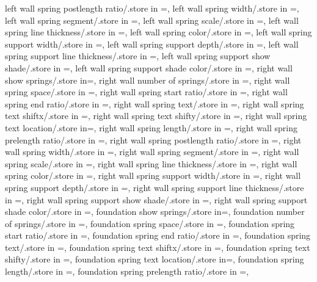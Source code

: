 {left wall spring postlength ratio/.store in =\leftwpostlenratio,
left wall spring width/.store in =\leftwampl,
left wall spring segment/.store in =\leftwsegm,
left wall spring scale/.store in =\leftwspringscale,
left wall spring line thickness/.store in =\leftwspringthk,
left wall spring color/.store in =\leftwspringcolor,
left wall spring support width/.store in =\leftwsuppwidth,
left wall spring support depth/.store in =\leftwsuppdepth,
left wall spring support line thickness/.store in =\leftwsupplinethk,
left wall spring support show shade/.store in =\leftwshowsuppshade,
left wall spring support shade color/.store in =\leftwsuppshadecol,
right wall show springs/.store in=\rightwshowsprings,
right wall number of springs/.store in =\rightwspringnumber,
right wall spring space/.store in =\rightwspringspace,
right wall spring start ratio/.store in =\rightwspringstartratio,
right wall spring end ratio/.store in =\rightwspringendratio,
right wall spring text/.store in =\rightwspringtext,
right wall spring text shiftx/.store in =\rightwtextshiftx,
right wall spring text shifty/.store in =\rightwtextshifty,
right wall spring text location/.store in=\rightwspringtextloc,
right wall spring length/.store in =\rightwspringlength,
right wall spring prelength ratio/.store in =\rightwprelenratio,
right wall spring postlength ratio/.store in =\rightwpostlenratio,
right wall spring width/.store in =\rightwampl,
right wall spring segment/.store in =\rightwsegm,
right wall spring scale/.store in =\rightwspringscale,
right wall spring line thickness/.store in =\rightwspringthk,
right wall spring color/.store in =\rightwspringcolor,
right wall spring support width/.store in =\rightwsuppwidth,
right wall spring support depth/.store in =\rightwsuppdepth,
right wall spring support line thickness/.store in =\rightwsupplinethk,
right wall spring support show shade/.store in =\rightwshowsuppshade,
right wall spring support shade color/.store in =\rightwsuppshadecol,
foundation show springs/.store in=\foundshowsprings,
foundation number of springs/.store in =\foundspringnumber,
foundation spring space/.store in =\foundspringspace,
foundation spring start ratio/.store in =\foundspringstartratio,
foundation spring end ratio/.store in =\foundspringendratio,
foundation spring text/.store in =\foundspringtext,
foundation spring text shiftx/.store in =\foundtextshiftx,
foundation spring text shifty/.store in =\foundtextshifty,
foundation spring text location/.store in=\foundspringtextloc,
foundation spring length/.store in =\foundspringlength,
foundation spring prelength ratio/.store in =\foundprelenratio,
}

